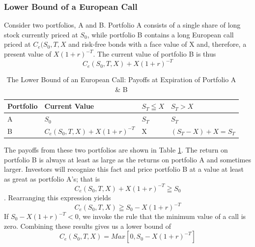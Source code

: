 \documentclass{book}
\theoremstyle{definition}
\theoremstyle{remark}
\begin{document}
            
        \subsubsection{Lower Bound of a European Call}
        
            Consider two portfolios, A and B. Portfolio A consists of  a single share of long stock currently priced at $S_0$, while portfolio B contains a long European call priced at $C_e(S_0,T, X$ and risk-free bonds with a face value of X and, therefore, a present value of $X(1+r)^{-T}$. The current value of portfolio B is thus $$ C_e(S_0, T, X) + X(1+r)^{-T} $$

                \begin{table}[h]
                    \centering
                    \caption{The Lower Bound of an European Call: Payoffs at Expiration of Portfolio A \& B}
                    \label{tab:EcallLB}
                        \begin{center} 
                        \begin{tabular}[h]{llll}
                        \toprule    
                            Portfolio & Current Value & $S_T \leqq X$ & $S_T > X$ \\
                        \midrule    
                            A & $S_0$ & $S_T$ & $S_T$ \\
                            B & $C_e(S_0, T, X) + X(1+r)^{-T}$ & X & $(S_T - X) + X = S_T$ \\
                        \bottomrule
                        \end{tabular} 
                        \end{center}
                \end{table}            
            
            The payoffs from these two portfolios are shown in Table \ref{tab:EcallLB}. The return on portfolio B is always at least as large as the returns on portfolio A and sometimes larger. Investors will recognize this fact and price portfolio B at a value at least as great as portfolio A's; that is $$ C_e(S_0, T, X) + X(1+r)^{-T} \geqq S_0 $$. Rearranging this expression yields $$ C_e(S_0, T, X) \geqq S_0 - X(1+r)^{-T} $$
            If $ S_0 - X(1+r)^{-T} < 0$, we invoke the rule that the minimum value of a call is zero. Combining these results gives us a lower bound of
                \begin{equation}
                     C_e(S_0, T, X) = Max \left[ 0, S_0 - X(1+r)^{-T} \right]
                \end{equation}
\end{document}
